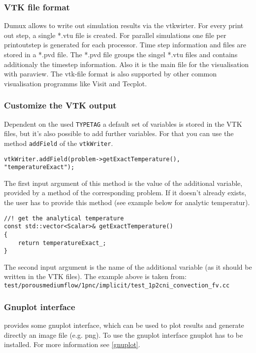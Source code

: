 \subsubsection{VTK file format}
Dumux allows to write out simulation results via the vtkwirter.
For every print out step, a single *.vtu file is created. For parallel simulations one file
per printoutstep is generated for each processor. 
Time step information and files are stored in a *.pvd file.
The *.pvd file groups the singel *.vtu files and contains additionaly the timestep information.
Also it is the main file for the visualisation with paraview.
The vtk-file format is also supported by other common visualisation programms like Visit and Tecplot. 

\subsubsection{Customize the VTK output}
Dependent on the used \texttt{TYPETAG} a default set of variables is stored in the VTK files, but it's also possible
to add further variables. For that you can use the method \texttt{addField} of the \texttt{vtkWriter}.
\begin{lstlisting}[style=DumuxCode]
vtkWriter.addField(problem->getExactTemperature(), "temperatureExact");
\end{lstlisting}

The first input argument of this method is the value of the additional variable, provided by a method of the corresponding problem.
If it doesn't already exists, the user has to provide this method (see example below for analytic temperatur).
\begin{lstlisting}[style=DumuxCode]
//! get the analytical temperature
const std::vector<Scalar>& getExactTemperature()
{
    return temperatureExact_;
}
\end{lstlisting}

The second input argument is the name of the additional variable (as it should be written in the VTK files).
The example above is taken from:\\ \texttt{test/porousmediumflow/1pnc/implicit/test\_1p2cni\_convection\_fv.cc}

\subsubsection{Gnuplot interface}
\Dumux provides some gnuplot interface, which can be used to plot results and generate directly an 
image file (e.g. png). To use the gnuplot interface gnuplot has to be installed. For more information see \ref{gnuplot}.

